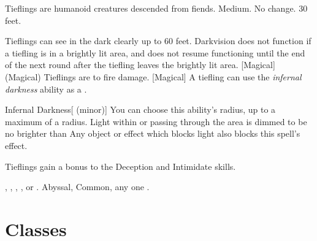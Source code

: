         Tieflings are humanoid creatures descended from fiends.
         Medium.
         No change.
         30 feet.
        \begin{itemize}
             Tieflings can see in the dark clearly up to 60 feet. Darkvision does not function if a tiefling is in a brightly lit area, and does not resume functioning until the end of the next round after the tiefling leaves the brightly lit area.
            [Magical] (Magical) Tieflings are  to fire damage.
            [Magical] A tiefling can use the \textit{infernal darkness} ability as a .
                \begin{durationability}{Infernal Darkness}[ (minor)]
                    \rankline
                    You can choose this ability's radius, up to a maximum of a \areamed radius.
                    Light within or passing through the area is dimmed to be no brighter than 
                    Any object or effect which blocks light also blocks this spell's effect.
                \end{durationability}
             Tieflings gain a  bonus to the Deception and Intimidate skills.
        \end{itemize}
         , , , , or .
         Abyssal, Common, any one .


\section{Classes}
